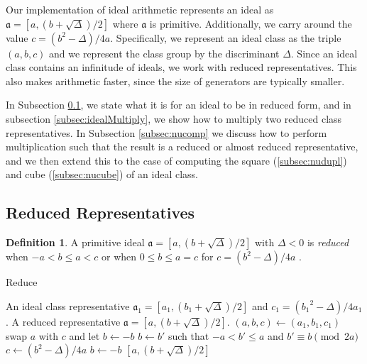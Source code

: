 \documentclass{ucalgthes1}
\theoremstyle{definition}
\newtheorem{defn}[thm]{Definition}
\begin{document}
Our implementation of ideal arithmetic represents an ideal as $\mathfrak a = [a, (b + \sqrt\Delta)/2]$ where $\mathfrak a$ is primitive.  Additionally, we carry around the value $c = (b^2 - \Delta)/4a$.  Specifically, we represent an ideal class as the triple $(a, b, c)$ and we represent the class group by the discriminant $\Delta$. Since an ideal class contains an infinitude of ideals, we work with reduced representatives.  This also makes arithmetic faster, since the size of generators are typically smaller.

In Subsection \ref{subsec:reduction}, we state what it is for an ideal to be in reduced form, and in subsection \ref{subsec:idealMultiply}, we show how to multiply two reduced class representatives. In Subsection \ref{subsec:nucomp} we discuss how to perform multiplication such that the result is a reduced or almost reduced representative, and we then extend this to the case of computing the square (\ref{subsec:nudupl}) and cube (\ref{subsec:nucube}) of an ideal class.  


\subsection{Reduced Representatives}
\label{subsec:reduction}

\begin{defn}
A primitive ideal $\mathfrak{a} = [a, (b+\sqrt{\Delta})/2]$ with $\Delta < 0$ is \emph{reduced} when $-a < b \le a < c$ or when $0 \le b \le a = c$ for $c = (b^2 - \Delta)/4a$ \cite[p.241]{Crandall2000}.
\end{defn}

\begin{algorithm}[h]
\caption{Reduce}
\label{alg:reduce}
\begin{algorithmic}[1]
\REQUIRE An ideal class representative $\mathfrak a_1 = [a_1, (b_1+\sqrt\Delta)/2]$ and $c_1 = ({b_1}^2 - \Delta)/4a_1$.
\ENSURE A reduced representative $\mathfrak a = [a, (b+\sqrt\Delta)/2]$.
\STATE $(a, b, c) \gets (a_1, b_1, c_1)$
		\STATE swap $a$ with $c$ and let $b \gets -b$
	\ENDIF
		\STATE $b \gets b'$ such that $-a < b' \le a$ and $b' \equiv b \pmod{2a}$
		\STATE $c \gets (b^2-\Delta)/4a$
	\ENDIF
\ENDWHILE
{}
	\STATE $b \gets -b$
\ENDIF
\RETURN $[a, (b+\sqrt\Delta)/2]$
\end{algorithmic}
\end{algorithm}
\end{document}

